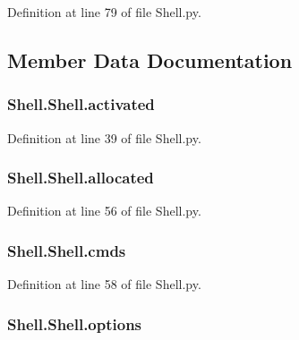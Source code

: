 Definition at line 79 of file Shell.\-py.



\subsection{Member Data Documentation}
\hypertarget{class_shell_1_1_shell_a5869d648354d59617e4a9836ef0c4ba3}{
\subsubsection[{activated}]{\setlength{\rightskip}{0pt plus 5cm}Shell.\-Shell.\-activated}}\label{class_shell_1_1_shell_a5869d648354d59617e4a9836ef0c4ba3}


Definition at line 39 of file Shell.\-py.

\hypertarget{class_shell_1_1_shell_a7d3526fa682799bd7be51fa09c2c9017}{
\subsubsection[{allocated}]{\setlength{\rightskip}{0pt plus 5cm}Shell.\-Shell.\-allocated}}\label{class_shell_1_1_shell_a7d3526fa682799bd7be51fa09c2c9017}


Definition at line 56 of file Shell.\-py.

\hypertarget{class_shell_1_1_shell_abe2dca7284b995f29494ae5e2ea975a7}{
\subsubsection[{cmds}]{\setlength{\rightskip}{0pt plus 5cm}Shell.\-Shell.\-cmds}}\label{class_shell_1_1_shell_abe2dca7284b995f29494ae5e2ea975a7}


Definition at line 58 of file Shell.\-py.

\hypertarget{class_shell_1_1_shell_a3e2a9754ac3fa0e2a00c5f0861ef85f2}{
\subsubsection[{options}]{\setlength{\rightskip}{0pt plus 5cm}Shell.\-Shell.\-options}}\label{class_shell_1_1_shell_a3e2a9754ac3fa0e2a00c5f0861ef85f2}


